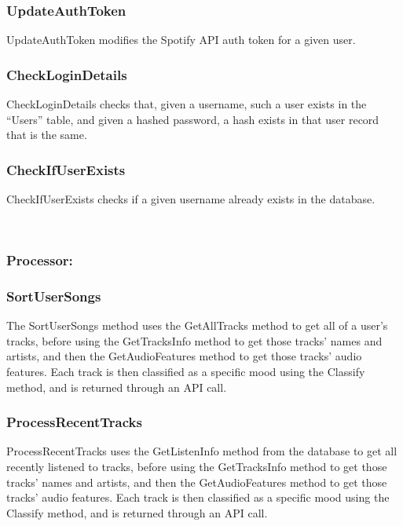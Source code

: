 \documentclass[10pt]{report}
\begin{document}
\subsubsection{UpdateAuthToken}
UpdateAuthToken modifies the Spotify API auth token for a given user.

\subsubsection{CheckLoginDetails}
CheckLoginDetails checks that, given a username, such a user exists in the “Users” table, and given a hashed password, a hash exists in that user record that is the same.

\subsubsection{CheckIfUserExists}
CheckIfUserExists checks if a given username already exists in the database.



\leavevmode \\

\subsubsection{Processor:}

\hrulefill

\subsubsection{SortUserSongs}
The SortUserSongs method uses the GetAllTracks method to get all of a user’s tracks, before using the GetTracksInfo method to get those tracks’ names and artists, and then the GetAudioFeatures method to get those tracks’ audio features. Each track is then classified as a specific mood using the Classify method, and is returned through an API call.

\subsubsection{ProcessRecentTracks}
ProcessRecentTracks uses the GetListenInfo method from the database to get all recently listened to tracks, before using the GetTracksInfo method to get those tracks’ names and artists, and then the GetAudioFeatures method to get those tracks’ audio features. Each track is then classified as a specific mood using the Classify method, and is returned through an API call.
\end{document}
